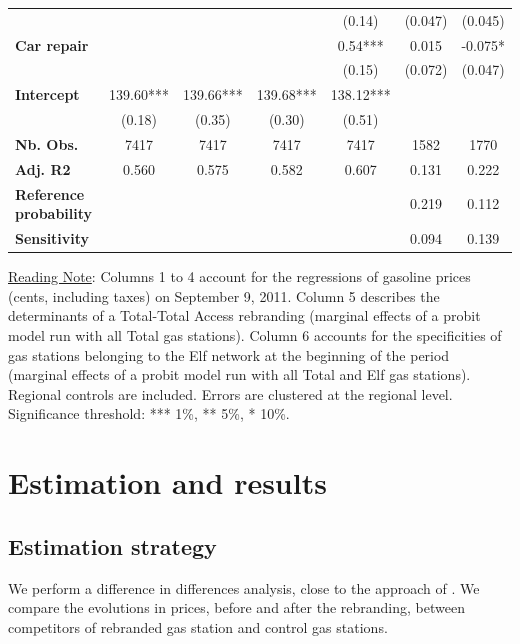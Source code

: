 \documentclass[english]{article}
\begin{document}
\begin{table}
\begin{threeparttable}
\begin{footnotesize}
\begin{tabular}{l|cccccc}
 &  &  &  & (0.14)  & (0.047)  & (0.045)\tabularnewline
\textbf{Car repair}  &  &  &  & 0.54{*}{*}{*}  & 0.015  & -0.075{*}\tabularnewline
 &  &  &  & (0.15)  & (0.072)  & (0.047)\tabularnewline
\hline
\textbf{Intercept}  & 139.60{*}{*}{*}  & 139.66{*}{*}{*}  & 139.68{*}{*}{*}  & 138.12{*}{*}{*}  &  & \tabularnewline
 & (0.18)  & (0.35)  & (0.30)  & (0.51)  &  & \tabularnewline
\hline
\textbf{Nb. Obs.}  & 7417  & 7417  & 7417  & 7417  & 1582  & 1770\tabularnewline
\textbf{Adj. R2}  & 0.560  & 0.575  & 0.582  & 0.607  & 0.131  & 0.222\tabularnewline
\textbf{Reference probability}  &  &  &  &  & 0.219  & 0.112\tabularnewline
\textbf{Sensitivity}  &  &  &  &  & 0.094  & 0.139\tabularnewline
\hline
\hline
\end{tabular}
\end{footnotesize}
\end{threeparttable}
\parbox{\textwidth}{\small%
\vspace{2eX} %
{\small{}\uline{Reading Note}}{\small{}: } Columns 1 to 4 account for the regressions of gasoline prices (cents, including taxes) on September 9, 2011. Column 5 describes the determinants of a Total-Total Access rebranding (marginal effects of a probit model run with all Total gas stations). Column 6 accounts for the specificities of gas stations belonging to the Elf network at the beginning of the period (marginal effects of a probit model run with all Total and Elf gas stations). Regional controls are included. Errors are clustered at the regional level. Significance threshold: {*}{*}{*} 1\%, {*}{*} 5\%, {*} 10\%.}
\end{table}

\section{Estimation and results}

\subsection{Estimation strategy}

We perform a difference in differences analysis, close to the approach of \cite{HAS04}. We compare the evolutions in prices, before and after the rebranding, between competitors of rebranded gas station and control gas stations.\medskip{}
\end{document}
